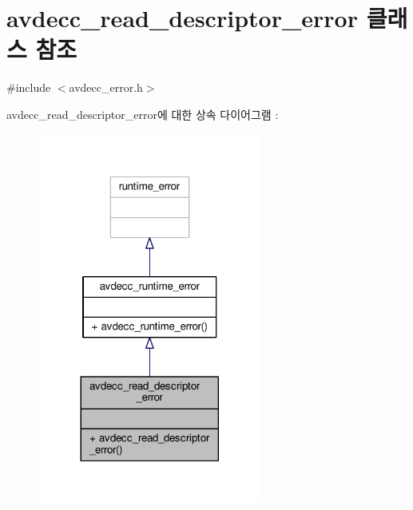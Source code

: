 \hypertarget{classavdecc__lib_1_1avdecc__read__descriptor__error}{}\section{avdecc\+\_\+read\+\_\+descriptor\+\_\+error 클래스 참조}
\label{classavdecc__lib_1_1avdecc__read__descriptor__error}


{\ttfamily \#include $<$avdecc\+\_\+error.\+h$>$}



avdecc\+\_\+read\+\_\+descriptor\+\_\+error에 대한 상속 다이어그램 \+: 
\nopagebreak
\begin{figure}[H]
\begin{center}
\leavevmode
\includegraphics[width=209pt]{classavdecc__lib_1_1avdecc__read__descriptor__error__inherit__graph}
\end{center}
\end{figure}



